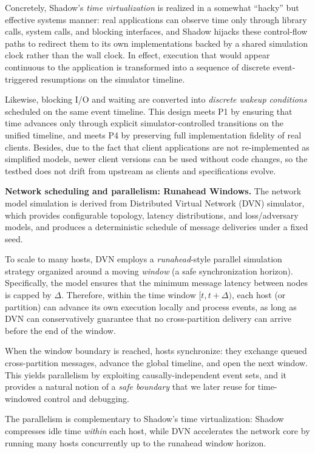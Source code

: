 Concretely, Shadow's \emph{time virtualization} is realized in a somewhat ``hacky'' but effective systems manner: real applications can observe time only through library calls, system calls, and blocking interfaces, and Shadow hijacks these control-flow paths to redirect them to its own implementations backed by a shared simulation clock rather than the wall clock. In effect, execution that would appear continuous to the application is transformed into a sequence of discrete event-triggered resumptions on the simulator timeline.

Likewise, blocking I/O and waiting are converted into \emph{discrete wakeup conditions} scheduled on the same event timeline.
This design meets P1 by ensuring that time advances only through explicit simulator-controlled transitions on the unified timeline, and meets P4 by preserving full implementation fidelity of real clients.
Besides, due to the fact that client applications are not re-implemented as simplified models, newer client versions can be used without code changes, so the testbed does not drift from upstream as clients and specifications evolve. 


\smallskip
\noindent\textbf{Network scheduling and parallelism: Runahead Windows.}
The network model simulation is derived from Distributed Virtual Network (DVN) simulator, which provides configurable topology, latency distributions, and loss/adversary models, and produces a deterministic schedule of message deliveries under a fixed seed.
  
To scale to many hosts, DVN employs a \emph{runahead}-style parallel simulation strategy organized around a moving \emph{window} (a safe synchronization horizon). Specifically, the model ensures that the minimum message latency between nodes is capped by \(\Delta\). Therefore, within the time window \([t, t+\Delta)\), each host (or partition) can advance its own execution locally and process events, as long as DVN can conservatively guarantee that no cross-partition delivery can arrive before the end of the window.

When the window boundary is reached, hosts synchronize: they exchange queued cross-partition messages, advance the global timeline, and open the next window.
This yields parallelism by exploiting causally-independent event sets, and it provides a natural notion of a \emph{safe boundary} that we later reuse for time-windowed control and debugging.

The parallelism is complementary to Shadow's time virtualization: Shadow compresses idle time \emph{within} each host, while DVN accelerates the network core by running many hosts concurrently up to the runahead window horizon.
  
